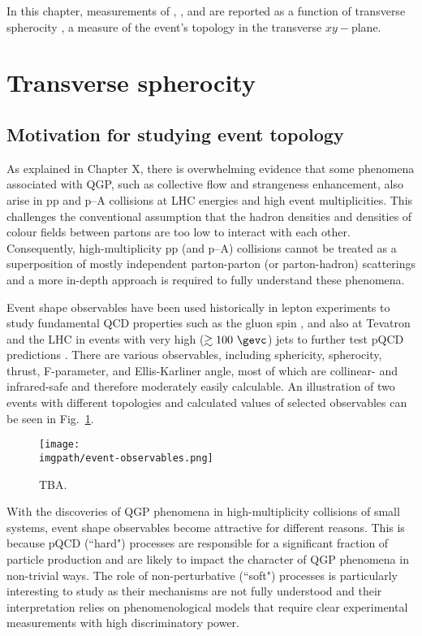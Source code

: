\def \imgpath {"./figures/sphero"}
In this chapter, measurements of \KOs, \LA, and \AL are reported as a function of transverse spherocity \SOPT, a measure of the event's topology in the transverse $xy-$plane. 
\section{Transverse spherocity}

\subsection{Motivation for studying event topology}

As explained in Chapter X, there is overwhelming evidence that some phenomena associated with QGP, such as collective flow and strangeness enhancement, also arise in pp and p--A collisions at LHC energies and high event multiplicities. This challenges the conventional assumption that the hadron densities and densities of colour fields between partons are too low to interact with each other. Consequently, high-multiplicity pp (and p--A) collisions cannot be treated as a superposition of mostly independent parton-parton (or parton-hadron) scatterings and a more in-depth approach  is required to fully understand these phenomena.

Event shape observables have been used historically in lepton experiments to study fundamental QCD properties such as the gluon spin \cite{petra-tasso-gluonspin}, and also at Tevatron and the LHC in events with very high \pt ($\gtrsim 100~\gevc$) jets to further test pQCD predictions \cite{antonio-sphero-motivation}. There are various observables, including sphericity, spherocity, thrust, F-parameter, and Ellis-Karliner angle, most of which are collinear- and infrared-safe and therefore moderately easily calculable\cite{banfi-eventshape-pheno}. An illustration of two events with different topologies and calculated values of selected observables can be seen in Fig.~\ref{fig:sphero:topologies}.

\begin{figure}%
\texttt{[image: \\imgpath/event-observables.png]}
\caption{TBA.}
\label{fig:sphero:topologies}
\end{figure}

With the discoveries of QGP phenomena in high-multiplicity collisions of small systems, event shape observables become attractive for different reasons. This is because pQCD (``hard") processes are responsible for a significant fraction of particle production and are likely to impact the character of QGP phenomena in non-trivial ways. The role of non-perturbative (``soft") processes is particularly interesting to study as their mechanisms are not fully understood and their interpretation relies on phenomenological models that require clear experimental measurements with high discriminatory power. 

